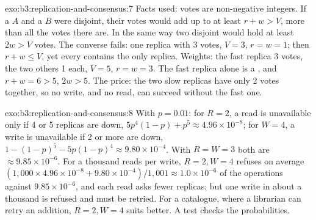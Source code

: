 \begin{solution}{exo:b3:replication-and-consensus:7}
Facts used: votes are non-negative integers. If a  $A$ and a  $B$ were disjoint, their votes would add up to at least $r + w > V$, more than all the votes there are. In the same way two disjoint  would hold at least $2w > V$ votes. The converse fails: one replica with 3 votes, $V = 3$, $r = w = 1$; then $r + w \le V$, yet every  contains the only replica. Weights: the fast replica 3 votes, the two others 1 each, $V = 5$, $r = w = 3$. The fast replica alone is a , and $r + w = 6 > 5$, $2w > 5$. The price: the two slow replicas have only 2 votes together, so no write, and no read, can succeed without the fast one.
\end{solution}

\begin{solution}{exo:b3:replication-and-consensus:8}
With $p = 0.01$: for $R = 2$, a read is unavailable only if 4 or 5 replicas are down, $5p^4(1 - p) + p^5 \approx 4.96 \times 10^{-8}$; for $W = 4$, a write is unavailable if 2 or more are down, $1 - (1 - p)^5 - 5p(1 - p)^4 \approx 9.80 \times 10^{-4}$. With $R = W = 3$ both are $\approx 9.85 \times 10^{-6}$. For a thousand reads per write, $R = 2, W = 4$ refuses on average $(1{,}000 \times 4.96 \times 10^{-8} + 9.80 \times 10^{-4})/1{,}001 \approx 1.0 \times 10^{-6}$ of the operations against $9.85 \times 10^{-6}$, and each read asks fewer replicas; but one write in about a thousand is refused and must be retried. For a catalogue, where a librarian can retry an addition, $R = 2, W = 4$ suits better. A test checks the probabilities.
\end{solution}

